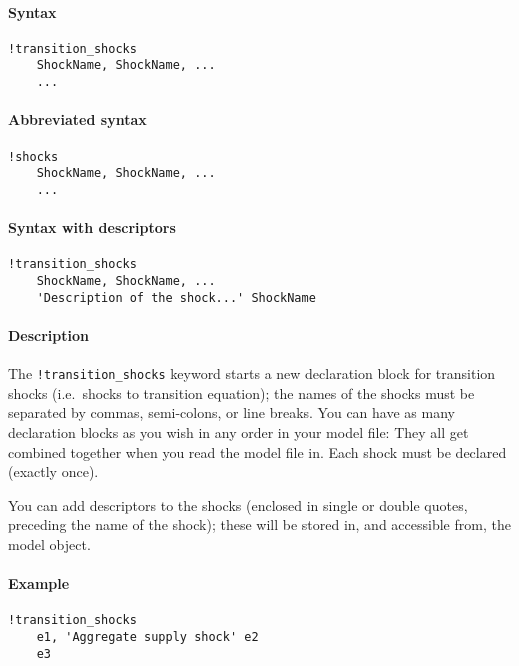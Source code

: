 


	\paragraph{Syntax}

\begin{verbatim}
!transition_shocks
    ShockName, ShockName, ...
    ...
\end{verbatim}

\paragraph{Abbreviated syntax}

\begin{verbatim}
!shocks
    ShockName, ShockName, ...
    ...
\end{verbatim}

\paragraph{Syntax with descriptors}

\begin{verbatim}
!transition_shocks
    ShockName, ShockName, ...
    'Description of the shock...' ShockName
\end{verbatim}

\paragraph{Description}

The \texttt{!transition\_shocks} keyword starts a new declaration block
for transition shocks (i.e.~shocks to transition equation); the names of
the shocks must be separated by commas, semi-colons, or line breaks. You
can have as many declaration blocks as you wish in any order in your
model file: They all get combined together when you read the model file
in. Each shock must be declared (exactly once).

You can add descriptors to the shocks (enclosed in single or double
quotes, preceding the name of the shock); these will be stored in, and
accessible from, the model object.

\paragraph{Example}

\begin{verbatim}
!transition_shocks
    e1, 'Aggregate supply shock' e2
    e3
\end{verbatim}


